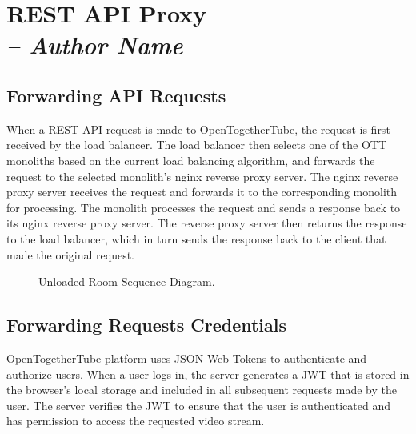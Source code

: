 \chapter{REST API Proxy \\
  \small{\textit{-- Author Name}}
  \label{Chapter::RestApiProxy}}

\section{Forwarding API Requests}
When a REST API request is made to OpenTogetherTube, the request is first received by the load balancer. The 
load balancer then selects one of the OTT monoliths based on the current load balancing algorithm, and forwards the 
request to the selected monolith's nginx reverse proxy server. The nginx reverse proxy server receives the request and 
forwards it to the corresponding monolith for processing. 
The monolith processes the request and sends a response back to its nginx reverse proxy server. The reverse proxy server 
then returns the response to the load balancer, which in turn sends the response back to the client that made the original
request.

\begin{figure}[!htb]
  \centering
  \caption{\label{Figure::api-balancer} Unloaded Room Sequence Diagram.}
\end{figure}

\section{Forwarding Requests Credentials}

OpenTogetherTube platform uses JSON Web Tokens to authenticate and authorize users. When a user logs in, the 
server generates a JWT that is stored in the browser's local storage and included in all subsequent requests made
by the user. The server verifies the JWT to ensure that the user is authenticated and has permission to access the 
requested video stream.